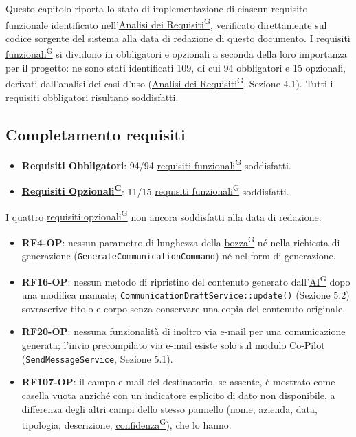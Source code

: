 \documentclass[a4paper,12pt]{article}
\providecommand{\glslink}[2]{\href{https://alittlebyte-19.github.io/Documentazione/glossario.html\#gls-#1}{\underline{#2}\textsuperscript{\scriptsize G}}}
\begin{document}
\begin{sloppypar}

Questo capitolo riporta lo stato di implementazione di ciascun requisito funzionale identificato nell'\glslink{analisi-dei-requisiti-adr}{Analisi dei Requisiti}, verificato direttamente sul codice sorgente del sistema alla data di redazione di questo documento. I \glslink{requisiti-funzionali}{requisiti funzionali} si dividono in obbligatori e opzionali a seconda della loro importanza per il progetto: ne sono stati identificati 109, di cui 94 obbligatori e 15 opzionali, derivati dall'analisi dei casi d'uso (\glslink{analisi-dei-requisiti-adr}{Analisi dei Requisiti}, Sezione 4.1). Tutti i requisiti obbligatori risultano soddisfatti.

\subsection{Completamento requisiti}

\begin{itemize}
    \item \textbf{Requisiti Obbligatori}: 94/94 \glslink{requisiti-funzionali}{requisiti funzionali} soddisfatti.
    \item \textbf{\glslink{requisiti-opzionali}{Requisiti Opzionali}}: 11/15 \glslink{requisiti-funzionali}{requisiti funzionali} soddisfatti.
\end{itemize}

I quattro \glslink{requisiti-opzionali}{requisiti opzionali} non ancora soddisfatti alla data di redazione:
\begin{itemize}
    \item \textbf{RF4-OP}: nessun parametro di lunghezza della \glslink{bozza-draft}{bozza} né nella richiesta di generazione (\texttt{GenerateCommunicationCommand}) né nel form di generazione.
    \item \textbf{RF16-OP}: nessun metodo di ripristino del contenuto generato dall'\glslink{intelligenza-artificiale-ai}{AI} dopo una modifica manuale; \texttt{CommunicationDraftService::update()} (Sezione 5.2) sovrascrive titolo e corpo senza conservare una copia del contenuto originale.
    \item \textbf{RF20-OP}: nessuna funzionalità di inoltro via e-mail per una comunicazione generata; l'invio precompilato via e-mail esiste solo sul modulo Co-Pilot (\texttt{SendMessageService}, Sezione 5.1).
    \item \textbf{RF107-OP}: il campo e-mail del destinatario, se assente, è mostrato come casella vuota anziché con un indicatore esplicito di dato non disponibile, a differenza degli altri campi dello stesso pannello (nome, azienda, data, tipologia, descrizione, \glslink{confidenza-confidence-score}{confidenza}), che lo hanno.
\end{itemize}


\end{sloppypar}
\end{document}
